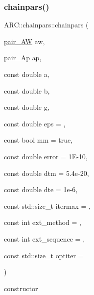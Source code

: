 \subsubsection{\texorpdfstring{chainpars()}{chainpars()}\hspace{0.1cm}{\footnotesize\ttfamily [2/2]}}
{\footnotesize\ttfamily A\+R\+C\+::chainpars\+::chainpars (\begin{DoxyParamCaption}\item[{\hyperlink{namespaceARC_adbfc7c72ce3d25363148027db0641abf}{pair\+\_\+\+AW}}]{aw,  }\item[{\hyperlink{namespaceARC_a819446c4644b3a3af7ef11574d0b55e0}{pair\+\_\+\+Ap}}]{ap,  }\item[{const double}]{a,  }\item[{const double}]{b,  }\item[{const double}]{g,  }\item[{const double}]{eps = {},  }\item[{const bool}]{mm = {\ttfamily true},  }\item[{const double}]{error = {\ttfamily 1E-\/10},  }\item[{const double}]{dtm = {\ttfamily 5.4e-\/20},  }\item[{const double}]{dte = {\ttfamily 1e-\/6},  }\item[{const std\+::size\+\_\+t}]{itermax = {},  }\item[{const int}]{ext\+\_\+method = {},  }\item[{const int}]{ext\+\_\+sequence = {},  }\item[{const std\+::size\+\_\+t}]{optiter = {} }\end{DoxyParamCaption})\hspace{0.3cm}{\ttfamily [inline]}}



constructor 


